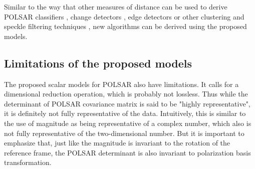 Similar to the way that other measures of distance can be used to derive POLSAR classifiers \cite{Lee_1999_TGRS}, change detectors \cite{Conradsen_2003_TGRS_4}, edge detectors \cite{Schou_2003_TGRS_20} or other clustering and speckle filtering techniques \cite{Le_2010_ACRS} \cite{Le_2011_ACRS}, new algorithms can be derived using the proposed models.


\subsection{Limitations of the proposed models}


The
                proposed scalar models for POLSAR also have limitations.
It
                calls for a dimensional reduction operation, which is
                probably not lossless.
Thus
                while the determinant of POLSAR covariance matrix is
                said to be "highly representative", it is definitely not
                fully representative of the data.
Intuitively,
                this is similar to the use of magnitude as being
                representative of a complex number, which also is not
                fully representative of the two-dimensional number.
But it is important to emphasize that,
                just like the magnitude is invariant to the rotation of
                the reference frame, the POLSAR determinant is also
                invariant to polarization basis transformation.

